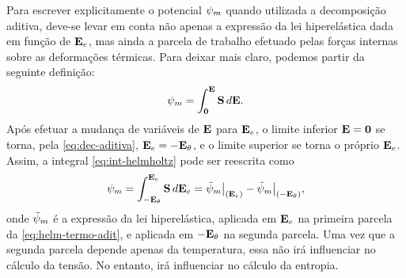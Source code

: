 \documentclass[Tese.tex]{subfiles}
\begin{document}
Para escrever explicitamente o potencial $\psi_m$ quando utilizada a decomposição aditiva, deve-se levar em conta não apenas a expressão da lei hiperelástica dada em função de $\mathbf{E}_e$, mas ainda a parcela de trabalho efetuado pelas forças internas sobre as deformações térmicas. Para deixar mais claro, podemos partir da seguinte definição:
\begin{equation}\label{eq:int-helmholtz}
\psi_m = \int_{\mathbf{0}}^{\mathbf{E}}\mathbf{S}\,d\mathbf{E}.
\end{equation}
Após efetuar a mudança de variáveis de $\mathbf{E}$ para $\mathbf{E}_e$, o limite inferior $\mathbf{E}=\mathbf{0}$ se torna, pela \cref{eq:dec-aditiva}, $\mathbf{E}_e=-\mathbf{E}_{\theta}$, e o limite superior se torna o próprio $\mathbf{E}_e$. Assim, a integral \eqref{eq:int-helmholtz} pode ser reescrita como
\begin{equation}\label{eq:helm-termo-adit}
\psi_m = \int_{-\mathbf{E}_{\theta}}^{\mathbf{E}_e}\mathbf{S}\,d\mathbf{E}_e = \tilde{\psi}_m\big|_{(\mathbf{E}_e)} - \tilde{\psi}_m\big|_{(-\mathbf{E}_{\theta})},
\end{equation}
onde $\tilde{\psi}_m$ é a expressão da lei hiperelástica, aplicada em $\mathbf{E}_e$ na primeira parcela da \cref{eq:helm-termo-adit}, e aplicada em $-\mathbf{E}_{\theta}$ na segunda parcela. Uma vez que a segunda parcela depende apenas da temperatura, essa não irá influenciar no cálculo da tensão. No entanto, irá influenciar no cálculo da entropia.

\end{document}
